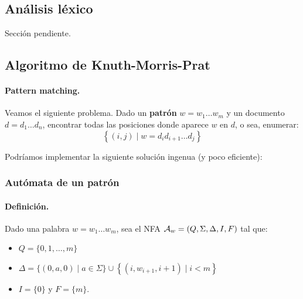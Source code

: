 \subsection{Análisis léxico}

Sección pendiente.

\subsection{Algoritmo de Knuth-Morris-Prat}

\paragraph{Pattern matching.} Veamos el siguiente problema. Dado un \textbf{patrón} $w = w_1 \ldots w_m$ y un documento $d = d_1 \ldots d_n$, encontrar todas las posiciones donde aparece $w$ en $d$, o sea, enumerar:
$$
    \left\{(i, j) \mid w=d_i d_{i+1} \ldots d_j\right\}
$$

Podríamos implementar la siguiente solución ingenua (y poco eficiente):
\vspace{-8pt}
\begin{algorithm}[hbt!]
    \DontPrintSemicolon
\end{algorithm}
\vspace{-8pt}
\subsubsection{Autómata de un patrón}

\paragraph{Definición.} Dado una palabra $w = w_1 \ldots w_m$, sea el NFA $\mathcal{A}_w = (Q,\Sigma,\Delta,I, F)$ tal que:
\begin{itemize}
    \item $Q = \{0,1,\ldots,m\}$
    \item $\Delta=\{(0, a, 0) \mid a \in \Sigma\} \cup\left\{\left(i, w_{i+1}, i+1\right) \mid i<m\right\}$
    \item $I = \{0\}$ y $F = \{m\}$.
\end{itemize}

